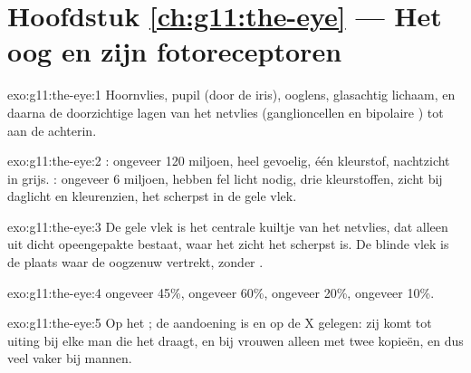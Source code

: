 \section*{Hoofdstuk \ref{ch:g11:the-eye} --- Het oog en zijn fotoreceptoren}

\begin{solution}{exo:g11:the-eye:1}
Hoornvlies, pupil (door de iris), ooglens, glasachtig lichaam, en daarna
de doorzichtige lagen van het netvlies (ganglioncellen en bipolaire
) tot aan de  achterin.
\end{solution}

\begin{solution}{exo:g11:the-eye:2}
: ongeveer 120 miljoen, heel gevoelig, één kleurstof, nachtzicht
in grijs. : ongeveer 6 miljoen, hebben fel licht nodig, drie
kleurstoffen, zicht bij daglicht en kleurenzien, het scherpst in de gele
vlek.
\end{solution}

\begin{solution}{exo:g11:the-eye:3}
De gele vlek is het centrale kuiltje van het netvlies, dat alleen uit
dicht opeengepakte  bestaat, waar het zicht het scherpst is. De
blinde vlek is de plaats waar de oogzenuw vertrekt, zonder
.
\end{solution}

\begin{solution}{exo:g11:the-eye:4}
 ongeveer 45\%,  ongeveer 60\%,  ongeveer
20\%,  ongeveer 10\%.
\end{solution}

\begin{solution}{exo:g11:the-eye:5}
Op het ; de aandoening is  en op de X gelegen: zij
komt tot uiting bij elke man die het  draagt, en bij vrouwen alleen
met twee kopieën, en dus veel vaker bij mannen.
\end{solution}

